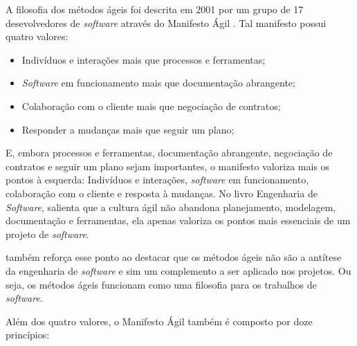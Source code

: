 \documentclass[
    12pt,       %
    openright,      %
    twoside,      %
    a4paper,      %
    english,      %
    french,       %
    spanish,      %
    brazil,       %
    ]{abntex2}
\begin{document}
A filosofia dos métodos ágeis foi descrita em 2001 por um grupo de 17 desevolvedores de \textit{software} através do Manifesto Ágil \cite{AGILEMANIFEST:2001}. Tal manifesto possui quatro valores:

\begin{itemize}
        \item Indivíduos e interações mais que processos e ferramentas;
        \item \textit{Software} em funcionamento mais que documentação abrangente;
        \item Colaboração com o cliente mais que negociação de contratos;
        \item Responder a mudanças mais que seguir um plano;
\end{itemize}

E, embora processos e ferramentas, documentação abrangente, negociação de contratos e seguir um plano sejam importantes, o manifesto valoriza mais os pontos à esquerda: Indivíduos e interações, \textit{software} em funcionamento, colaboração com o cliente e resposta à mudanças. No livro Engenharia de \textit{Software},  salienta que a cultura ágil não abandona planejamento, modelagem, documentação e ferramentas, ela apenas valoriza os pontos mais essenciais de um projeto de \textit{software}.

 também reforça esse ponto ao destacar que os métodos ágeis não são a antítese da engenharia de \textit{software} e sim um complemento a ser aplicado nos projetos. Ou seja, os métodos ágeis funcionam como uma filosofia para os trabalhos de \textit{software}.

Além dos quatro valores, o Manifesto Ágil \cite{AGILEMANIFEST:2001} também é composto por doze princípios: 
\end{document}
